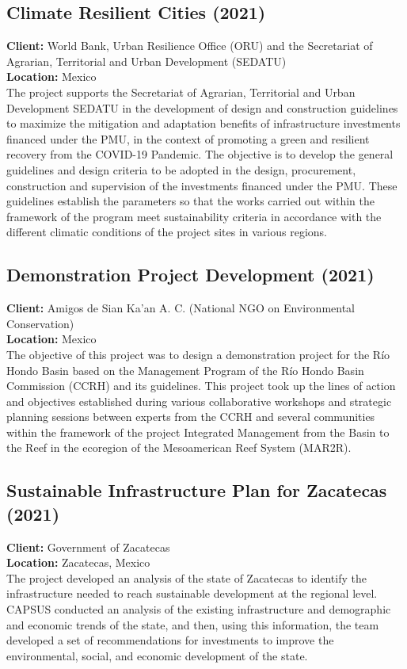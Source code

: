 \documentclass[
	a4paper,
	12pt,
	unnumberedsections,
]{CSSullivanBusinessReport}
\begin{document}
\subsection{Climate Resilient Cities (2021)}
\textbf{Client:}  World Bank, Urban Resilience Office (ORU) and the Secretariat of Agrarian, Territorial and Urban Development (SEDATU)  \\
\textbf{Location:}  Mexico \\[0.5em]
 The project supports the Secretariat of Agrarian, Territorial and Urban Development SEDATU in the development of design and construction guidelines to maximize the mitigation and adaptation benefits of infrastructure investments financed under the PMU, in the context of promoting a green and resilient recovery from the COVID-19 Pandemic. The objective is to develop the general guidelines and design criteria to be adopted in the design, procurement, construction and supervision of the investments financed under the PMU. These guidelines establish the parameters so that the works carried out within the framework of the program meet sustainability criteria in accordance with the different climatic conditions of the project sites in various regions.

\subsection{Demonstration Project Development (2021)}
\textbf{Client:}  Amigos de Sian Ka’an A. C. (National NGO on Environmental Conservation) \\
\textbf{Location:}  Mexico \\[0.5em]
 The objective of this project was to design a demonstration project for the Río Hondo Basin based on the Management Program of the Río Hondo Basin Commission (CCRH) and its guidelines. This project took up the lines of action and objectives established during various collaborative workshops and strategic planning sessions between experts from the CCRH and several communities within the framework of the project Integrated Management from the Basin to the Reef in the ecoregion of the Mesoamerican Reef System (MAR2R).

\subsection{Sustainable Infrastructure Plan for Zacatecas (2021)}
\textbf{Client:}  Government of Zacatecas \\
\textbf{Location:}  Zacatecas, Mexico  \\[0.5em]
 The project developed an analysis of the state of Zacatecas to identify the infrastructure needed to reach sustainable development at the regional level. CAPSUS conducted an analysis of the existing infrastructure and demographic and economic trends of the state, and then, using this information, the team developed a set of recommendations for investments to improve the environmental, social, and economic development of the state.
\end{document}
